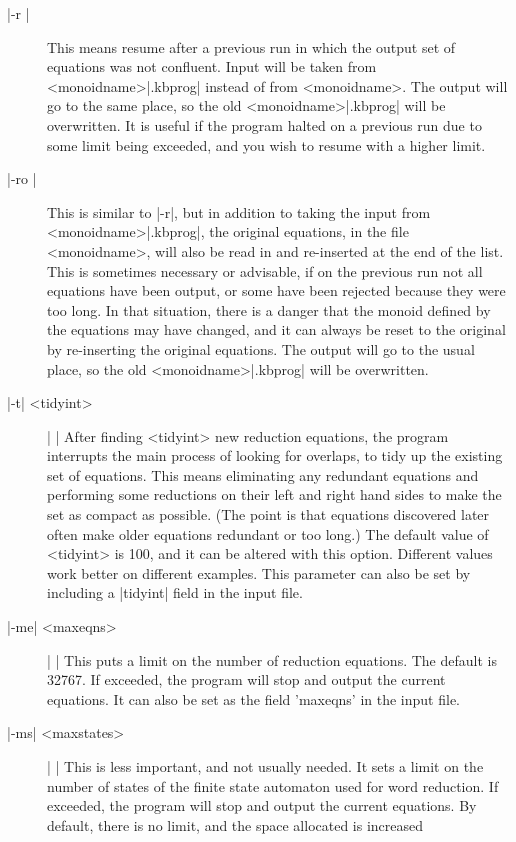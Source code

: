 \begin{description}
\item[|-r |]
This means resume after a previous run in which the output set of equations
was not confluent. Input will be taken from <monoidname>|.kbprog| instead of
from <monoidname>. The output will go to the same place, so the old
<monoidname>|.kbprog| will be overwritten.
It is useful if the program halted on a previous run due to some limit
being exceeded, and you wish to resume with a higher limit.
\item[|-ro |]
This is similar to |-r|, but in addition to taking the 
input from <monoidname>|.kbprog|, the original equations, in the file
<monoidname>, will also be read in and re-inserted at the end of the list.
This is sometimes necessary or advisable, if on the previous run not all
equations have been output, or some have been rejected because they were too
long. In that situation, there is a danger that the monoid defined by
the equations may have changed, and it can always be reset to the original
by re-inserting the original equations.
The output will go to the usual place, so the old
<monoidname>|.kbprog| will be overwritten.
\item[|-t| <tidyint>] | |\newline
After finding <tidyint> new reduction equations, the program interrupts
the main process of looking for overlaps, to tidy up the existing set of
equations. This means eliminating any redundant equations and performing
some reductions on their left and right hand sides to make the set as
compact as possible. (The point is that equations discovered later often
make older equations redundant or too long.) The default value of
<tidyint> is 100, and it can be altered with this option. Different values
work better on different examples. This parameter can also be set by
including a |tidyint| field in the input file.
\item[|-me| <maxeqns>] | |\newline
This puts a limit on the number of reduction equations.
The default is 32767.
If exceeded, the program will stop and output the current equations.
It can also be set as the field 'maxeqns' in the input file.
\item[|-ms| <maxstates>] | |\newline
This is less important, and not usually needed.
It sets a limit on the number of states of the finite state automaton
used for word reduction.
If exceeded, the program will stop and output the current equations.
By default, there is no limit, and the space allocated is increased

\end{description}
